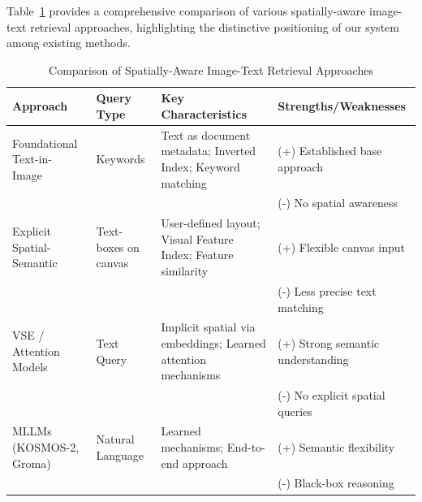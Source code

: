 \documentclass[manuscript,screen]{acmart}
\begin{document}
Table~\ref{tab:approaches} provides a comprehensive comparison of various spatially-aware image-text retrieval approaches, highlighting the distinctive positioning of our system among existing methods.

\begin{table}
    \caption{Comparison of Spatially-Aware Image-Text Retrieval Approaches}
    \label{tab:approaches}
    \begin{tabular}{p{2.8cm}p{2.8cm}p{4.5cm}p{3.4cm}}
        \toprule
        Approach                                     & Query Type                & Key Characteristics                                                           & Strengths/Weaknesses                 \\
        \midrule
        Foundational Text-in-Image~\cite{Manmatha00} & Keywords                  & Text as document metadata; Inverted Index; Keyword matching                   & (+) Established base approach        \\
                                                     &                           &                                                                               & (-) No spatial awareness             \\
        \midrule
        Explicit Spatial-Semantic~\cite{Mai17}       & Text-boxes on canvas      & User-defined layout; Visual Feature Index; Feature similarity                 & (+) Flexible canvas input            \\
                                                     &                           &                                                                               & (-) Less precise text matching       \\
        \midrule
        VSE / Attention Models~\cite{Faghri17}       & Text Query                & Implicit spatial via embeddings; Learned attention mechanisms & (+) Strong semantic understanding    \\
                                                     &                           &                                                                               & (-) No explicit spatial queries      \\
        \midrule
        MLLMs (KOSMOS-2, Groma)                      & Natural Language          & Learned mechanisms; End-to-end approach                                       & (+) Semantic flexibility             \\
                                                     &                           &                                                                               & (-) Black-box reasoning              \\

\end{tabular}
\end{table}
\end{document}
